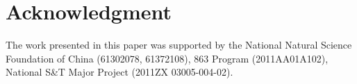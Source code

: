 \documentclass[AMA,STIX1COL]{WileyNJD-v2}
\begin{document}
%




\section*{Acknowledgment}

The work presented in this paper was supported by the National Natural Science Foundation of China (61302078, 61372108), 863 Program (2011AA01A102), National S\&T Major Project (2011ZX 03005-004-02).
\end{document}
